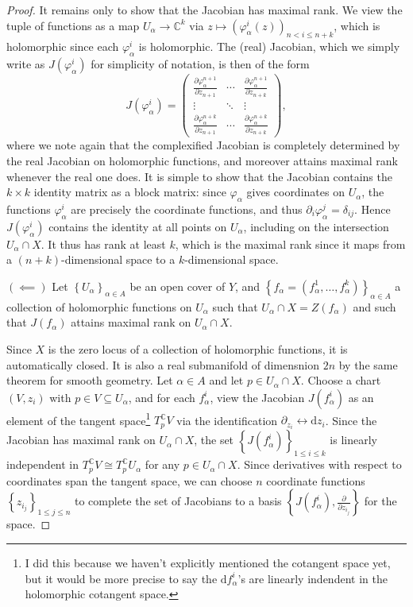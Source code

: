\documentclass[11pt, letterpaper]{article}
\theoremstyle{plain}
\begin{document}
\begin{proof}
	It remains only to show that the Jacobian has maximal rank. We view the tuple of functions as a map $U_\alpha \to \mathbb{C} ^k$ via $z\mapsto \left( \varphi _\alpha ^i(z) \right)_{n<i\leq n+k} $, which is holomorphic since each $\varphi _\alpha^i $ is holomorphic. The (real) Jacobian, which we simply write as $J(\varphi_\alpha ^i)$ for simplicity of notation, is then of the form
	\[
		J(\varphi _\alpha ^i)=\begin{pmatrix}
		\frac{\partial \varphi_\alpha ^{n+1} }{\partial z_{n+1} }  & \cdots  & \frac{\partial \varphi _\alpha ^{n+1} }{\partial z_{n+k} }  \\
		\vdots & \ddots& \vdots \\
		\frac{\partial \varphi _\alpha ^{n+k} }{\partial z_{n+1} }  & \cdots  & \frac{\partial \varphi _\alpha ^{n+k} }{\partial z_{n+k} } 
		\end{pmatrix},
	\]
	where we note again that the complexified Jacobian is completely determined by the real Jacobian on holomorphic functions, and moreover attains maximal rank whenever the real one does. It is simple to show that the Jacobian contains the $k\times k$ identity matrix as a block matrix: since $\varphi _\alpha $ gives coordinates on $U_\alpha $, the functions $\varphi _\alpha ^{i} $ are precisely the coordinate functions, and thus $\partial_i \varphi _\alpha ^j = \delta _{ij} $. Hence $J(\varphi _\alpha ^i)$ contains the identity at all points on $U_\alpha $, including on the intersection $U_\alpha \cap X$. It thus has rank at least $k$, which is the maximal rank since it maps from a $(n+k)$-dimensional space to a $k$-dimensional space.

	$(\impliedby )$ Let $\left\{ U_\alpha  \right\}_{\alpha \in A} $ be an open cover of $Y$, and $\left\{ f_\alpha =(f^1_\alpha , \ldots ,f^k_\alpha )\right\}_{\alpha \in A} $ a collection of holomorphic functions on $U_\alpha $ such that $U_\alpha \cap X = Z(f_\alpha )$ and such that $J(f_\alpha )$ attains maximal rank on $U_\alpha \cap X$.

	Since $X$ is the zero locus of a collection of holomorphic functions, it is automatically closed. It is also a real submanifold of dimensnion $2n$ by the same theorem for smooth geometry. Let $\alpha \in A$ and let $p\in U_\alpha \cap X$. Choose a chart $(V,z_i)$ with $p\in V \subseteq U_\alpha $, and for each $f_\alpha ^i$, view the Jacobian $J(f_\alpha ^i)$ as an element of the tangent space\footnote{I did this because we haven't explicitly mentioned the cotangent space yet, but it would be more precise to say the $\mathrm{d} f_\alpha ^i$'s are linearly indendent in the holomorphic cotangent space.} $T_p^\mathbb{C} V$ via the identification $\partial _{z_i} \leftrightarrow \mathrm{d} z_i$. Since the Jacobian has maximal rank on $U_\alpha \cap X$, the set $\left\{ J (f_{\alpha } ^i) \right\}_{1\leq i\leq k} $ is linearly independent in $T_p^\mathbb{C}V\cong T_p^\mathbb{C} U_\alpha $ for any $p\in U_\alpha \cap X$. Since derivatives with respect to coordinates span the tangent space, we can choose $n$ coordinate functions $\left\{ z_{i_j}  \right\}_{1\leq j\leq  n} $ to complete the set of Jacobians to a basis $\left\{ J (f_\alpha ^i), \frac{\partial }{\partial z_{i_j} }  \right\} $ for the space.


\end{proof}
\end{document}
